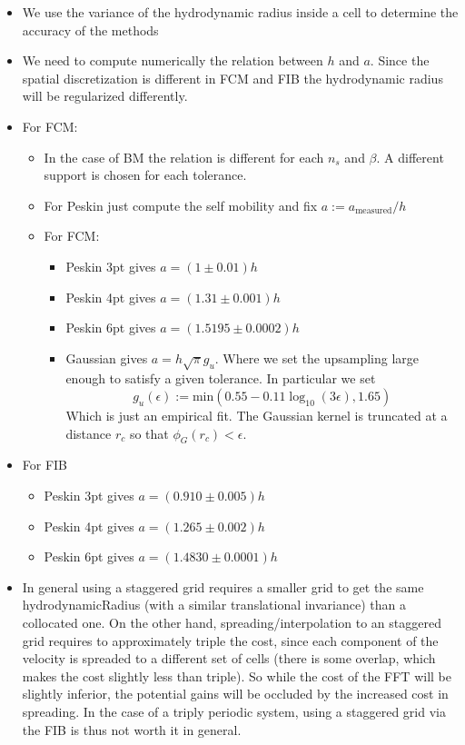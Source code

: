 \documentclass[ twoside,openright,titlepage,numbers=noenddot,%
headinclude,footinclude,cleardoublepage=empty,abstract=on,
BCOR=5mm,paper=a4,fontsize=11pt, dvipsnames
]{scrreprt}
\begin{document}
\begin{itemize}
\item We use the variance of the hydrodynamic radius inside a cell to determine the accuracy of the methods
\item We need to compute numerically the relation between $h$ and $a$. Since the spatial discretization is different in \gls{FCM} and \gls{FIB} the hydrodynamic radius will be regularized differently.
  \item For FCM:
  \begin{itemize}
  \item In the case of BM the relation is different for each $n_s$ and $\beta$. A different support is chosen for each tolerance.
  \item For Peskin just compute the self mobility and fix $a := a_{\text{measured}}/h$
  \item For FCM:
    \begin{itemize}
    \item Peskin 3pt gives $a=(1\pm 0.01) h$
    \item Peskin 4pt gives $a=(1.31\pm 0.001) h$
    \item Peskin 6pt gives $a=(1.5195 \pm 0.0002) h$
    \item Gaussian gives $a=h \sqrt{\pi} g_u$. Where we set the upsampling large enough to satisfy a given tolerance. In particular we set
      \begin{equation}
        g_u(\epsilon) := \text{min}\left(0.55 -0.11 \log_{10}(3\epsilon), 1.65\right)
      \end{equation}
      Which is just an empirical fit.
      The Gaussian kernel is truncated at a distance $r_c$ so that $\phi_G(r_c) < \epsilon$.
    \end{itemize}
  \end{itemize}
\item For FIB
  \begin{itemize}
  \item Peskin 3pt gives $a=(0.910\pm 0.005)h$
  \item Peskin 4pt gives $a=(1.265\pm 0.002)h$
  \item Peskin 6pt gives $a=(1.4830 \pm 0.0001 )h$
  \end{itemize}
\item In general using a staggered grid requires a smaller grid to get the same hydrodynamicRadius (with a similar translational invariance) than a collocated one. On the other hand, spreading/interpolation to an staggered grid requires to approximately triple the cost, since each component of the velocity is spreaded to a different set of cells (there is some overlap, which makes the cost slightly less than triple). So while the cost of the FFT will be slightly inferior, the potential gains will be occluded by the increased cost in spreading. In the case of a triply periodic system, using a staggered grid via the \gls{FIB} is thus not worth it in general.

\end{itemize}
\end{document}
